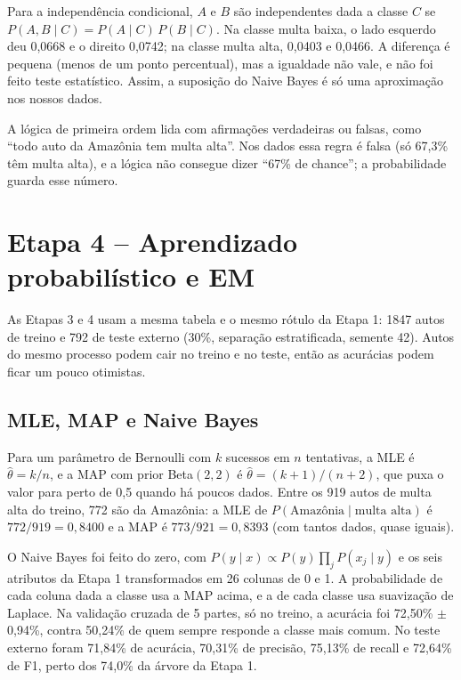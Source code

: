 \documentclass[11pt]{article}
\begin{document}
Para a independência condicional, $A$ e $B$ são independentes dada a classe $C$ se $P(A,B\mid C)=P(A\mid C)\,P(B\mid C)$. Na classe multa baixa, o lado esquerdo deu 0,0668 e o direito 0,0742; na classe multa alta, 0,0403 e 0,0466. A diferença é pequena (menos de um ponto percentual), mas a igualdade não vale, e não foi feito teste estatístico. Assim, a suposição do Naive Bayes é só uma aproximação nos nossos dados.

A lógica de primeira ordem lida com afirmações verdadeiras ou falsas, como ``todo auto da Amazônia tem multa alta''. Nos dados essa regra é falsa (só 67,3\% têm multa alta), e a lógica não consegue dizer ``67\% de chance''; a probabilidade guarda esse número.

\section{Etapa 4 -- Aprendizado probabilístico e EM}
As Etapas 3 e 4 usam a mesma tabela e o mesmo rótulo da Etapa 1: 1847 autos de treino e 792 de teste externo (30\%, separação estratificada, semente 42). Autos do mesmo processo podem cair no treino e no teste, então as acurácias podem ficar um pouco otimistas.

\subsection{MLE, MAP e Naive Bayes}
Para um parâmetro de Bernoulli com $k$ sucessos em $n$ tentativas, a MLE é $\hat\theta = k/n$, e a MAP com prior Beta$(2,2)$ é $\hat\theta = (k+1)/(n+2)$, que puxa o valor para perto de 0,5 quando há poucos dados. Entre os 919 autos de multa alta do treino, 772 são da Amazônia: a MLE de $P(\text{Amazônia}\mid\text{multa alta})$ é $772/919 = 0{,}8400$ e a MAP é $773/921 = 0{,}8393$ (com tantos dados, quase iguais).

O Naive Bayes foi feito do zero, com $P(y\mid x)\propto P(y)\prod_j P(x_j\mid y)$ e os seis atributos da Etapa 1 transformados em 26 colunas de 0 e 1. A probabilidade de cada coluna dada a classe usa a MAP acima, e a de cada classe usa suavização de Laplace. Na validação cruzada de 5 partes, só no treino, a acurácia foi 72,50\% $\pm$ 0,94\%, contra 50,24\% de quem sempre responde a classe mais comum. No teste externo foram 71,84\% de acurácia, 70,31\% de precisão, 75,13\% de recall e 72,64\% de F1, perto dos 74,0\% da árvore da Etapa 1.
\end{document}
